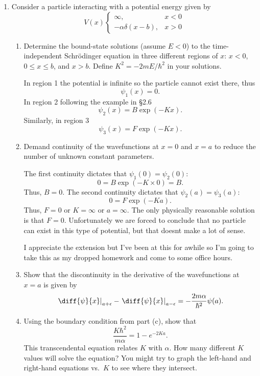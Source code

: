 \documentclass[a4paper, 12pt]{config/homework}
\begin{document}
\begin{enumerate}
\pagebreak
\item Consider a particle interacting with a potential energy given by
\[V(x)\begin{cases}
\infty, & x < 0 \\ -\alpha\delta(x-b), & x>0
\end{cases}\]
\begin{enumerate}
\item Determine the bound-state solutions (assume \(E<0\)) to the time-independent Schr{\"o}dinger equation in three different regions of \(x\): \(x<0\), \(0 \le x \le b\), and \(x > b\). Define \(K^2=-2mE/\hbar^2\) in your solutions.

In region 1 the potential is infinite so the particle cannot exist there, thus
\[\psi_1(x)=0.\]
In region 2 following the example in \S2.6
\[\psi_{2}(x) = B\exp(-Kx).\]
Similarly, in region 3
\[\psi_{3}(x) = F\exp(-Kx).\]

\item Demand continuity of the wavefunctions at \(x=0\) and \(x=a\) to reduce the number of unknown constant parameters.

The first continuity dictates that \(\psi_1(0) = \psi_2(0)\):
\[0 = B\exp(-K\times0) = B.\]
Thus, \(B=0\).
The second continuity dictates that \(\psi_2(a)=\psi_3(a)\):
\[0 = F\exp(-K a).\]
Thus, \(F=0\) or \(K=\infty\) or \(a=\infty\). The only physically reasonable solution is that \(F=0\). Unfortunately we are forced to conclude that no particle can exist in this type of potential, but that doesnt make a lot of sense.

I appreciate the extension but I've been at this for awhile so I'm going to take this as my dropped homework and come to some office hours.

\item Show that the discontinuity in the derivative of the wavefunctions at \(x=a\) is given by
\[\left.\diff{\psi}{x}\right|_{a+\epsilon} - \left.\diff{\psi}{x}\right|_{a-\epsilon} = - \frac{2m\alpha}{\hbar^2}\psi(a).\]


\item Using the boundary condition from part (c), show that
\[\frac{K\hbar^2}{m\alpha} = 1 - e^{-2Ka}.\]
This transcendental equation relates \(K\) with \(\alpha \). How many different \(K\) values will solve the equation? You might try to graph the left-hand and right-hand equations vs.\ \( K \) to see where they intersect.



\end{enumerate}
\end{enumerate}
\end{document}
